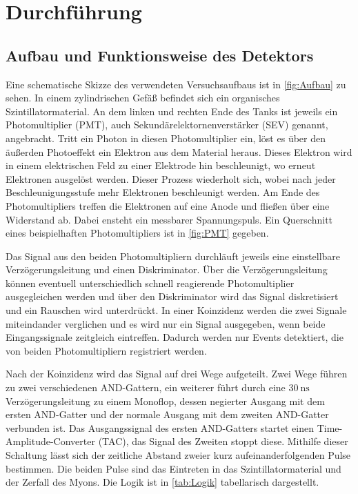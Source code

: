 \section{Durchführung}
\label{sec:Durchführung}
\subsection{Aufbau und Funktionsweise des Detektors}
\label{subsec:Aufbau}
Eine schematische Skizze des verwendeten Versuchsaufbaus ist in \autoref{fig:Aufbau} zu sehen. In einem zylindrischen Gefäß befindet sich ein organisches
Szintillatormaterial. An dem linken und rechten Ende des Tanks ist jeweils ein Photomultiplier (PMT), auch Sekundärelektornenverstärker (SEV) genannt, angebracht.
Tritt ein Photon in diesen Photomultiplier ein, löst es über den äußerden Photoeffekt ein Elektron aus dem Material heraus. Dieses Elektron wird in einem elektrischen Feld 
zu einer Elektrode hin beschleunigt, wo erneut Elektronen ausgelöst werden. Dieser Prozess wiederholt sich, wobei nach jeder Beschleunigungsstufe mehr Elektronen beschleunigt werden.
Am Ende des Photomultipliers treffen die Elektronen auf eine Anode und fließen über eine Widerstand ab. Dabei ensteht ein messbarer Spannungspuls. Ein Querschnitt eines beispielhaften
Photomultipliers ist in \autoref{fig:PMT} gegeben.

Das Signal aus den beiden Photomultipliern durchläuft jeweils eine einstellbare Verzögerungsleitung und einen Diskriminator. Über die Verzögerungsleitung können eventuell unterschiedlich
schnell reagierende Photomultiplier ausgegleichen werden und über den Diskriminator wird das Signal diskretisiert und ein Rauschen wird unterdrückt. In einer Koinzidenz werden die zwei 
Signale miteindander verglichen und es wird nur ein Signal ausgegeben, wenn beide Eingangssignale zeitgleich eintreffen. Dadurch werden nur Events detektiert, die von beiden
Photomultipliern registriert werden.

Nach der Koinzidenz wird das Signal auf drei Wege aufgeteilt. Zwei Wege führen zu zwei verschiedenen AND-Gattern, ein weiterer führt durch eine $\qty{30}{\nano\second}$ Verzögerungsleitung 
zu einem Monoflop, dessen negierter Ausgang mit dem ersten AND-Gatter und der normale Ausgang mit dem zweiten AND-Gatter verbunden ist. Das Ausgangssignal des ersten AND-Gatters startet 
einen Time-Amplitude-Converter (TAC), das Signal des Zweiten stoppt diese. Mithilfe dieser Schaltung lässt sich der zeitliche Abstand zweier kurz aufeinanderfolgenden Pulse bestimmen.
Die beiden Pulse sind das Eintreten in das Szintillatormaterial und der Zerfall des Myons. Die Logik ist in \autoref{tab:Logik} tabellarisch dargestellt.

